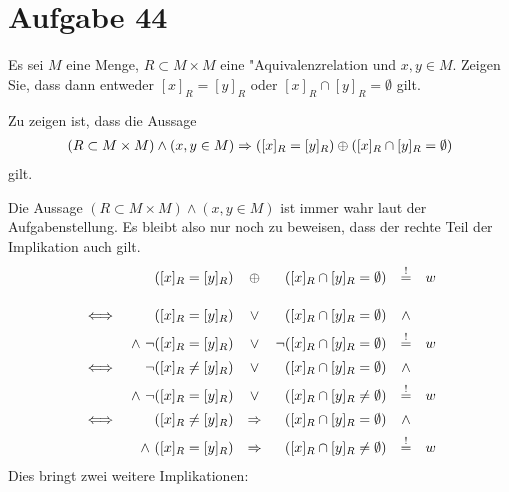 \section{Aufgabe 44}

Es sei $M$ eine Menge, $R \subset M \times M$ eine "Aquivalenzrelation und $x,
y \in M$. Zeigen Sie, dass dann entweder $[x]_R = [y]_R$ oder $[x]_R \cap [y]_R
= \emptyset$ gilt.

Zu zeigen ist, dass die Aussage
\begin{align*}
    (R \subset M \times M) \land (x, y \in M) \Rightarrow ([x]_R = [y]_R) \oplus ([x]_R \cap [y]_R = \emptyset)
\end{align*}
gilt.

Die Aussage $(R \subset M \times M) \land (x, y \in M)$ ist immer wahr laut der
Aufgabenstellung. Es bleibt also nur noch zu beweisen, dass der rechte Teil
der Implikation auch gilt.
\begin{equation*}
    \begin{array}{rrcrcl}
                         &([x]_R = [y]_R) &\oplus&           ([x]_R \cap [y]_R    = \emptyset) &\overset{!}{=}& w \\[15pt]
        \iff             &([x]_R = [y]_R) &\lor&           ([x]_R \cap [y]_R    = \emptyset) &\land& \\[5pt]
             &\land\ \lnot([x]_R = [y]_R) &\lor&      \lnot([x]_R \cap [y]_R    = \emptyset) &\overset{!}{=}& w \\[5pt]
        \iff &\lnot([x]_R \neq [y]_R)     &\lor&           ([x]_R \cap [y]_R    = \emptyset) &\land& \\[5pt]
             &\land\ \lnot([x]_R = [y]_R) &\lor&           ([x]_R \cap [y]_R \neq \emptyset) &\overset{!}{=}& w \\[5pt]
        \iff             &([x]_R \neq [y]_R) &\Rightarrow& ([x]_R \cap [y]_R    = \emptyset) &\land& \\[5pt]
                  &\land\ ([x]_R = [y]_R)    &\Rightarrow& ([x]_R \cap [y]_R \neq \emptyset) &\overset{!}{=}& w
     \end{array}
\end{equation*}
Dies bringt zwei weitere Implikationen:
